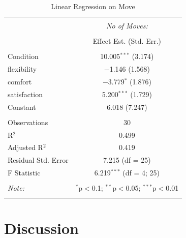 \documentclass{sigchi}
\begin{document}
\begin{table}[!htbp] \centering 
  \caption{Linear Regression on Move} 
  \label{} 
\begin{tabular}{@{\extracolsep{5pt}}lc} 
\\[-1.8ex]\hline 
\hline \\[-1.8ex] 
 & \multicolumn{1}{c}{\textit{No of Moves:}} \\ 
\cline{2-2} 
\\[-1.8ex] & Effect Est. (Std. Err.) \\ 
\hline \\[-1.8ex] 
 Condition & 10.005$^{***}$  (3.174) \\ 
 flexibility & $-$1.146  (1.568) \\ 
 comfort & $-$3.779$^{*}$  (1.876) \\ 
 satisfaction & 5.200$^{***}$  (1.729) \\ 
 Constant & 6.018  (7.247) \\ 
 
\hline \\[-1.8ex] 
Observations & 30 \\ 
R$^{2}$ & 0.499 \\ 
Adjusted R$^{2}$ & 0.419 \\ 
Residual Std. Error & 7.215 (df = 25) \\ 
F Statistic & 6.219$^{***}$ (df = 4; 25) \\ 
\hline 
\hline \\[-1.8ex] 
\textit{Note:}  & \multicolumn{1}{r}{$^{*}$p$<$0.1; $^{**}$p$<$0.05; $^{***}$p$<$0.01} \\ 
\normalsize 
\end{tabular} 
\end{table} 

\section{Discussion}
\end{document}
